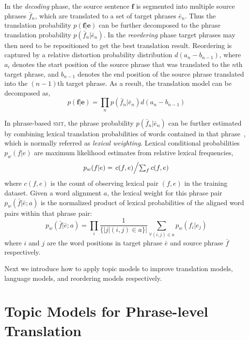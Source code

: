 In the \textit{decoding} phase, the source sentence $\mathbf{f}$ is segmented into multiple source
phrases $\bar{f}_n$, which are translated to a set
of target phrases $\bar{e}_n$. Thus the translation probability
$p(\mathbf{f}|\mathbf{e})$ can be further decomposed to the phrase
translation probability $p(\bar{f}_n | \bar{e}_n)$.
In the \textit{reordering} phase target phrases may then need to be repositioned to get the best
translation result. Reordering is captured by a relative distortion
probability distribution $d(a_n - b_{n-1})$, where $a_i$ denotes the
start position of the source phrase that was translated to the $n$th
target phrase, and $b_{n-1}$ denotes the end position of the source
phrase translated into the $(n-1)$th target phrase. As a result, the
translation model can be decomposed as,
\begin{equation}
p(\mathbf{f}|\mathbf{e}) = \prod_{n} p(\bar{f}_n | \bar{e}_n) d(a_n - b_{n-1})
\end{equation}

In phrase-based \textsc{smt}, the phrase probability $p(\bar{f}_n |
\bar{e}_n)$ can be further estimated by combining lexical translation
probabilities of words contained in that phrase~\citep{koehn-03},
which is normally referred as \textit{lexical weighting}. Lexical
conditional probabilities $p_w(f|e)$ are maximum likelihood estimates
from relative lexical frequencies,
\begin{equation}
\label{eq:lexical_prob}
p_w(f|e) = \textstyle \left.c(f, e)\middle/\sum_f{c(f, e)}\right.
\end{equation}
where $c(f, e)$ is the count of observing lexical pair $(f, e)$ in the
training dataset. Given a word alignment $a$, the lexical weight for
this phrase pair $p_w(\bar{f} | \bar{e}; a)$ is the normalized product
of lexical probabilities of the aligned word pairs within that phrase
pair:
\begin{equation}
\label{eq:phrase_prob}
p_w(\bar{f} | \bar{e}; a) = \prod_{i} \frac{1}{\{|j | (i, j) \in a\}|} \sum_{\forall (i,j) \in a} p_w(f_i | e_j)
\end{equation}
where $i$ and $j$ are the word positions in target phrase $\bar{e}$
and source phrase $\bar{f}$ respectively.

Next we introduce how to apply topic models to improve translation
models, language models, and reordering models respectively.


\section{Topic Models for Phrase-level Translation}
\label{sec:trans-multiling}

